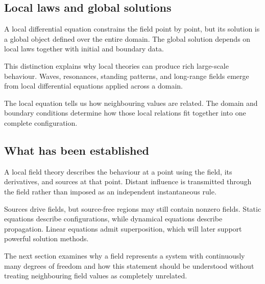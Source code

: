 \subsection{Local laws and global solutions}

A local differential equation constrains the field point by point, but its solution is a global object defined over the entire domain. The global solution depends on local laws together with initial and boundary data.

This distinction explains why local theories can produce rich large-scale behaviour. Waves, resonances, standing patterns, and long-range fields emerge from local differential equations applied across a domain.

The local equation tells us how neighbouring values are related. The domain and boundary conditions determine how those local relations fit together into one complete configuration.

\subsection{What has been established}

A local field theory describes the behaviour at a point using the field, its derivatives, and sources at that point. Distant influence is transmitted through the field rather than imposed as an independent instantaneous rule.

Sources drive fields, but source-free regions may still contain nonzero fields. Static equations describe configurations, while dynamical equations describe propagation. Linear equations admit superposition, which will later support powerful solution methods.

The next section examines why a field represents a system with continuously many degrees of freedom and how this statement should be understood without treating neighbouring field values as completely unrelated.